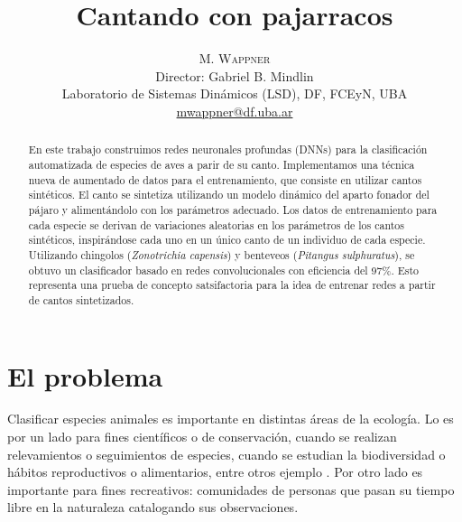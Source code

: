\documentclass[12pt,twoside,a4paper]{article}
\title{\vspace{-15mm}\fontsize{20pt}{15pt}\selectfont\textbf{Cantando con pajarracos \vspace{-5mm}}} %
\author{
\large
\textsc{M. Wappner} \\[-4mm] %
\vspace{-4mm}
\normalsize Director: Gabriel B. Mindlin \\
\vspace{-4mm}
\normalsize Laboratorio de Sistemas Dinámicos (LSD), DF, FCEyN, UBA \\ %
\footnotesize{
\href{mailto:mwappner@df.uba.ar}{mwappner@df.uba.ar} %
\vspace{-6mm}
}}
\date{}
\begin{document}
\tableofcontents


\thispagestyle{fancy} %


\begin{abstract}

\vspace{-3mm}
En este trabajo construimos redes neuronales profundas (DNNs) para la clasificación automatizada de especies de aves a parir de su canto. Implementamos una técnica nueva de aumentado de datos para el entrenamiento, que consiste en utilizar cantos sintéticos. El canto se sintetiza utilizando un modelo dinámico del aparto fonador del pájaro y alimentándolo con los parámetros adecuado. Los datos de entrenamiento para cada especie se derivan de variaciones aleatorias en los parámetros de los cantos sintéticos, inspirándose cada uno en un único canto de un individuo de cada especie. Utilizando chingolos (\textit{Zonotrichia capensis}) y benteveos (\textit{Pitangus sulphuratus}), se obtuvo un clasificador basado en redes convolucionales con eficiencia del 97\%. Esto representa una prueba de concepto satsifactoria para la idea de entrenar redes a partir de cantos sintetizados.
\vspace{-2mm}

\end{abstract}




\section{El problema}
\label{sec:intro}

Clasificar especies animales es importante en distintas áreas de la ecología. Lo es por un lado para fines científicos o de conservación, cuando se realizan relevamientos o seguimientos de especies, cuando se estudian la biodiversidad o hábitos reproductivos o alimentarios, entre otros ejemplo . Por otro lado es importante para fines recreativos: comunidades de personas que pasan su tiempo libre en la naturaleza catalogando sus observaciones.
\end{document}
